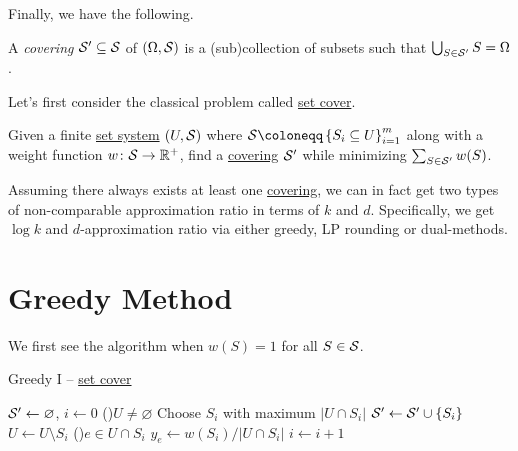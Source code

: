 Finally, we have the following.

\begin{definition}[Covering]\label{def:covering}
	A \emph{covering} \(\mathcal{\MakeUppercase{S}} ^\prime \subseteq \mathcal{\MakeUppercase{S}} \) of \((\Omega , \mathcal{\MakeUppercase{S}} )\) is a (sub)collection of subsets such that \(\bigcup_{S\in \mathcal{\MakeUppercase{S}} ^\prime }S = \Omega\).
\end{definition}

Let's first consider the classical problem called \hyperref[prb:set-cover]{set cover}.

\begin{problem}\label{prb:set-cover}
Given a finite \hyperref[def:set-system]{set system} \((U, \mathcal{\MakeUppercase{S}} )\) where \(\mathcal{\MakeUppercase{S}} \coloneqq \left\{ S_i\subseteq U\right\}_{i=1}^m \) along with a weight function \(w\colon \mathcal{\MakeUppercase{S}} \to \mathbb{\MakeUppercase{r}} ^+\), find a \hyperref[def:covering]{covering} \(\mathcal{\MakeUppercase{S}} ^\prime \) while minimizing \(\sum_{S\in \mathcal{\MakeUppercase{S}} ^\prime }w(S)\).
\end{problem}

Assuming there always exists at least one \hyperref[def:covering]{covering}, we can in fact get two types of non-comparable approximation ratio in terms of \(k\) and \(d\). Specifically, we get \(\log k\) and \(d\)-approximation ratio via either greedy, LP rounding or dual-methods.

\section{Greedy Method}
We first see the algorithm when \(w(S) = 1\) for all \(S\in \mathcal{\MakeUppercase{S}} \).

\begin{algorithm}[H]\label{algo:set-cover-greedy}
	\DontPrintSemicolon
	\caption{Greedy I -- \hyperref[prb:set-cover]{set cover}}
	\BlankLine

	\(\mathcal{\MakeUppercase{S}} ^\prime \gets \varnothing \), \(i\gets 0\)\;
	\While(){\(U \neq \varnothing \)}{
		Choose \(S_i\) with maximum \(\left\vert U \cap S_i \right\vert\)
		\(\mathcal{\MakeUppercase{S}} ^\prime \gets \mathcal{\MakeUppercase{S}} ^\prime \cup \left\{ S_i \right\} \)\;
		\(U\gets U\setminus S_i\)\;\label{line5:algo:set-cover-greedy}
		\For(){\(e\in U \cap S_i\) }{
			\(y_e \gets w(S_{i}) / \left\vert U \cap S_i \right\vert \)
		}
		\(i\gets i+1\)\;
	}
	\;
\end{algorithm}

